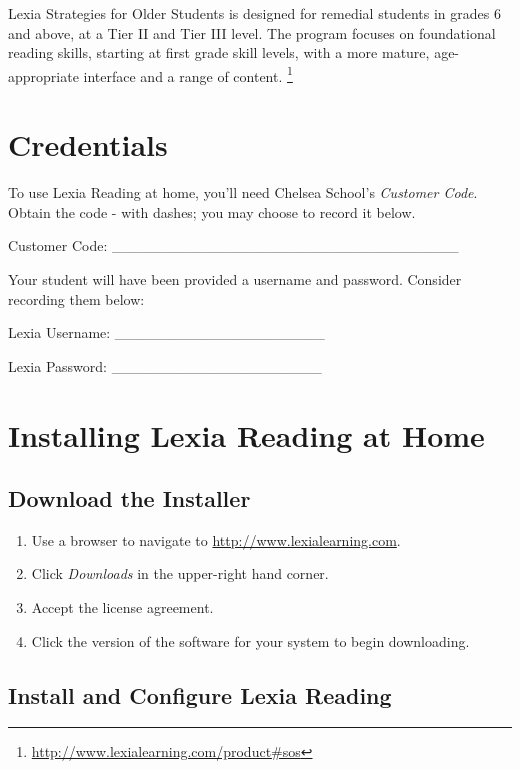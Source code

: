 \documentclass[letterpaper,10pt,english]{sphinxmanual}
\begin{document}
Lexia Strategies for Older Students is designed for remedial students in grades 6 and above, at a Tier II and Tier III level. The program focuses on foundational reading skills, starting at first grade skill levels, with a more mature, age-appropriate interface and a range of content. \footnote{
\href{http://www.lexialearning.com/product\#sos}{http://www.lexialearning.com/product\#sos}
}


\section{Credentials}
\label{lexia:credentials}
To use Lexia Reading at home, you'll need Chelsea School's \emph{Customer Code}. Obtain the code - with dashes; you may choose to record it below.

Customer Code: \_\_\_\_\_\_\_\_\_\_\_\_\_\_\_\_\_\_\_\_\_\_\_\_\_\_\_\_\_\_\_\_\_

Your student will have been provided a username and password. Consider recording them below:

Lexia Username: \_\_\_\_\_\_\_\_\_\_\_\_\_\_\_\_\_\_\_\_

Lexia Password: \_\_\_\_\_\_\_\_\_\_\_\_\_\_\_\_\_\_\_\_


\section{Installing Lexia Reading at Home}
\label{lexia:installing-lexia-reading-at-home}

\subsection{Download the Installer}
\label{lexia:download-the-installer}\begin{enumerate}
\item {} 
Use a browser to navigate to \href{http://www.lexialearning.com}{http://www.lexialearning.com}.

\item {} 
Click \emph{Downloads} in the upper-right hand corner.

\item {} 
Accept the license agreement.

\item {} 
Click the version of the software for your system to begin downloading.

\end{enumerate}


\subsection{Install and Configure Lexia Reading}
\label{lexia:install-and-configure-lexia-reading}
\end{document}

